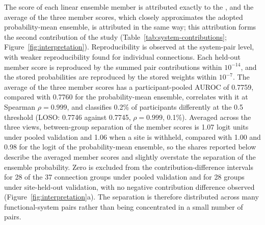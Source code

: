 The score of each linear ensemble member is attributed exactly to the , and the average of the three member scores, which closely approximates the adopted probability-mean ensemble, is attributed in the same way; this attribution forms the second contribution of the study (Table~\ref{tab:system-contributions}; Figure~\ref{fig:interpretation}). Reproducibility is observed at the system-pair level, with weaker reproducibility found for individual connections. Each held-out member score is reproduced by the summed pair contributions within $10^{-14}$, and the stored probabilities are reproduced by the stored weights within $10^{-7}$. The average of the three member scores has a participant-pooled AUROC of 0.7759, compared with 0.7760 for the probability-mean ensemble, correlates with it at Spearman $\rho=0.999$, and classifies 0.2\% of participants differently at the 0.5 threshold (LOSO: 0.7746 against 0.7745, $\rho=0.999$, 0.1\%). Averaged across the three views, between-group separation of the member scores is 1.07 logit units under pooled validation and 1.06 when a site is withheld, compared with 1.00 and 0.98 for the logit of the probability-mean ensemble, so the shares reported below describe the averaged member scores and slightly overstate the separation of the ensemble probability. Zero is excluded from the contribution-difference intervals for 28 of the 37 connection groups under pooled validation and for 28 groups under site-held-out validation, with no negative contribution difference observed (Figure~\ref{fig:interpretation}a). The separation is therefore distributed across many functional-system pairs rather than being concentrated in a small number of pairs.

